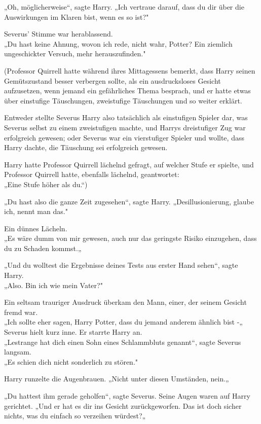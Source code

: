 {„Oh, möglicherweise“, sagte Harry. „Ich vertraue darauf, dass du dir über die Auswirkungen im Klaren bist, wenn es so ist?"

Severus' Stimme war herablassend.\\ „Du hast keine Ahnung, wovon ich rede, nicht wahr, Potter? Ein ziemlich ungeschickter Versuch, mehr herauszufinden."

(Professor Quirrell hatte während ihres Mittagessens bemerkt, dass Harry seinen Gemütszustand besser verbergen sollte, als ein ausdrucksloses Gesicht aufzusetzen, wenn jemand ein gefährliches Thema besprach, und er hatte etwas über einstufige Täuschungen, zweistufige Täuschungen und so weiter erklärt.

Entweder stellte Severus Harry also tatsächlich als einstufigen Spieler dar, was Severus selbst zu einem zweistufigen machte, und Harrys dreistufiger Zug war erfolgreich gewesen; oder Severus war ein vierstufiger Spieler und wollte, dass\\ Harry dachte, die Täuschung sei erfolgreich gewesen.

Harry hatte Professor Quirrell lächelnd gefragt, auf welcher Stufe er spielte, und Professor Quirrell hatte, ebenfalls lächelnd, geantwortet:\\ „Eine Stufe höher als du.“)

„Du hast also die ganze Zeit zugesehen“, sagte Harry. „Desillusionierung, glaube ich, nennt man das."

Ein dünnes Lächeln.\\ „Es wäre dumm von mir gewesen, auch nur das geringste Risiko einzugehen, dass du zu Schaden kommst.„

„Und du wolltest die Ergebnisse deines Tests aus erster Hand sehen“, sagte Harry.\\ „Also. Bin ich wie mein Vater?"

Ein seltsam trauriger Ausdruck überkam den Mann, einer, der seinem Gesicht fremd war.\\ „Ich sollte eher sagen, Harry Potter, dass du jemand anderem ähnlich bist -„\\ Severus hielt kurz inne. Er starrte Harry an.\\ „Lestrange hat dich einen Sohn eines Schlammbluts genannt“, sagte Severus langsam.\\ „Es schien dich nicht sonderlich zu stören."

Harry runzelte die Augenbrauen. „Nicht unter diesen Umständen, nein.„

„Du hattest ihm gerade geholfen“, sagte Severus. Seine Augen waren auf Harry gerichtet. „Und er hat es dir ins Gesicht zurückgeworfen. Das ist doch sicher nichts, was du einfach so verzeihen würdest?„

}
